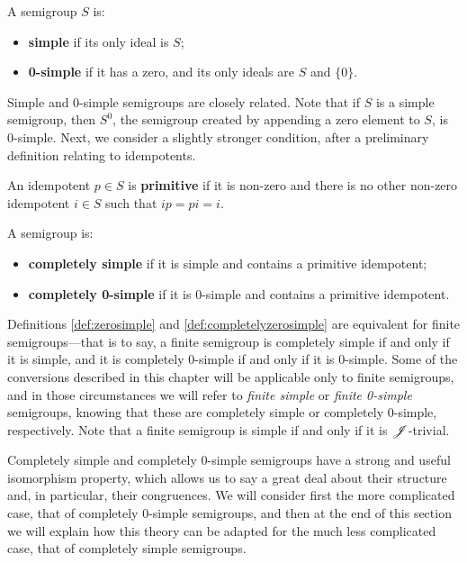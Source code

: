 \begin{definition}
  \label{def:zerosimple}
  A semigroup $S$ is:
  \begin{itemize}
  \item \textbf{simple} if its only ideal is $S$;
  \item \textbf{0-simple} if it has a zero, and its only ideals are $S$ and
    $\{0\}$.
  \end{itemize}
\end{definition}

Simple and 0-simple semigroups are closely related.  Note that if $S$ is a
simple semigroup, then $S^0$, the semigroup created by appending a zero element
to $S$, is 0-simple.
Next, we consider a slightly stronger condition, after a preliminary definition
relating to idempotents.

\begin{definition}
  \label{def:primitive}
  An idempotent $p \in S$ is \textbf{primitive} if it is non-zero and there is
  no other non-zero idempotent $i \in S$ such that $ip = pi = i$.
\end{definition}

\begin{definition}
  \label{def:completelyzerosimple}
  A semigroup is:
  \begin{itemize}
  \item \textbf{completely simple} if it is simple and contains a primitive
    idempotent;
  \item \textbf{completely 0-simple} if it is 0-simple and contains a primitive
    idempotent.
  \end{itemize}
\end{definition}

Definitions \ref{def:zerosimple} and \ref{def:completelyzerosimple} are
equivalent for finite semigroups---that is to say, a finite semigroup is
completely simple if and only if it is simple, and it is completely 0-simple if
and only if it is 0-simple.  Some of the conversions described in this chapter
will be applicable only to finite semigroups, and in those circumstances we will
refer to \textit{finite simple} or \textit{finite 0-simple} semigroups, knowing
that these are completely simple or completely 0-simple, respectively.
Note that a finite semigroup is simple if and only if it is $\mathrel{\mathscr{J}}$-trivial.

Completely simple and completely 0-simple semigroups have a strong and useful
isomorphism property, which allows us to say a great deal about their structure
and, in particular, their congruences.  We will consider first the more
complicated case, that of completely 0-simple semigroups, and then at the end of
this section we will explain how this theory can be adapted for the much less
complicated case, that of completely simple semigroups.

